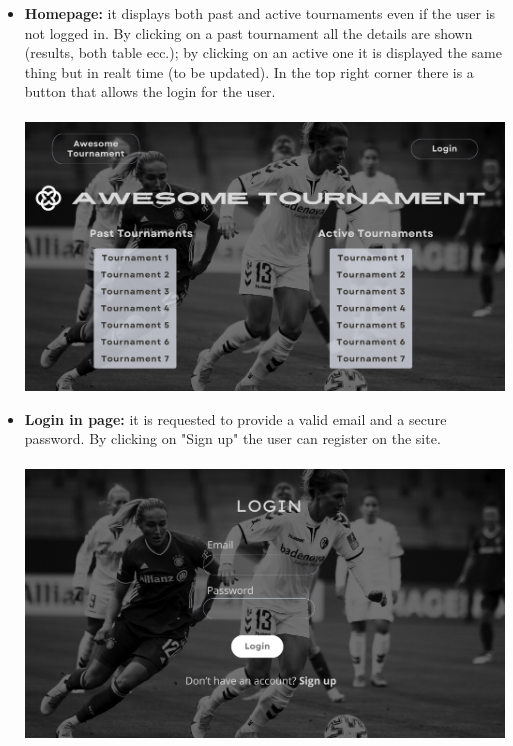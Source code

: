 \begin{itemize}
    \item \textbf{Homepage:} it displays both past and active tournaments even if the user is not logged in. By clicking on a past tournament all the details are shown (results, both table ecc.); by clicking on an active one it is displayed the same thing but in realt time (to be updated). In the top right corner there is a button that allows the login for the user.\\\\
    \includegraphics[scale = 0.36]{sections/homepage.png}

    \item \textbf{Login in page:} it is requested to provide a valid email and a secure password. By clicking on "Sign up" the user can register on the site.\\\\
    \includegraphics[scale = 0.36]{sections/login.png}


\end{itemize}

